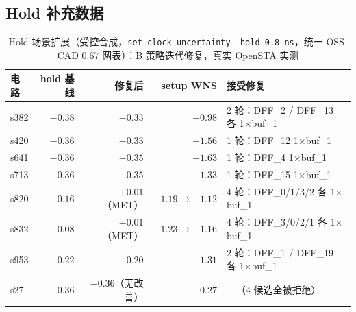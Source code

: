 \documentclass[journal]{IEEEtran}
\begin{document}
\begin{appendices}
\section{Hold 补充数据}\label{app:hold}

\begin{table}[!htbp]
\centering
\caption{Hold 场景扩展（受控合成，\texttt{set\_clock\_uncertainty -hold 0.8\,ns}，统一 OSS-CAD 0.67 网表）：B 策略迭代修复，真实 OpenSTA 实测}
\label{tab:hold}
\scriptsize
\setlength{\tabcolsep}{2pt}
\begin{tabular}{lrrrp{2.0cm}}
\toprule
\textbf{电路} & \textbf{hold 基线} & \textbf{修复后} & \textbf{setup WNS} & \textbf{接受修复} \\
\midrule
s382 & $-0.38$ & $-0.33$ & $-0.98$ & 2 轮：DFF\_2 / DFF\_13 各 1$\times$buf\_1 \\
s420 & $-0.36$ & $-0.33$ & $-1.56$ & 1 轮：DFF\_12 1$\times$buf\_1 \\
s641 & $-0.36$ & $-0.35$ & $-1.63$ & 1 轮：DFF\_4 1$\times$buf\_1 \\
s713 & $-0.36$ & $-0.35$ & $-1.33$ & 1 轮：DFF\_15 1$\times$buf\_1 \\
s820 & $-0.16$ & $+0.01$（MET） & $-1.19\rightarrow -1.12$ & 4 轮：DFF\_0/1/3/2 各 1$\times$buf\_1 \\
s832 & $-0.08$ & $+0.01$（MET） & $-1.23\rightarrow -1.16$ & 4 轮：DFF\_3/0/2/1 各 1$\times$buf\_1 \\
s953 & $-0.22$ & $-0.20$ & $-1.31$ & 2 轮：DFF\_1 / DFF\_19 各 1$\times$buf\_1 \\
s27 & $-0.36$ & $-0.36$（无改善） & $-0.27$ & ---（4 候选全被拒绝） \\
\bottomrule
\end{tabular}
\end{table}

\end{appendices}
\end{document}
